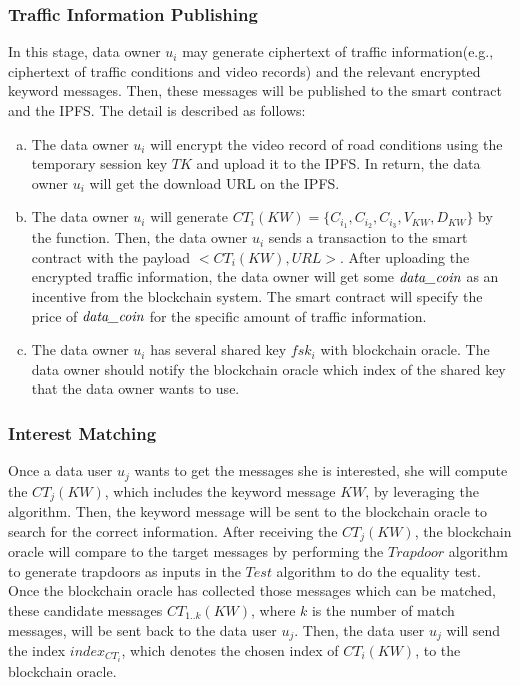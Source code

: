 \documentclass[journal]{IEEEtran}
\begin{document}
    \subsubsection{\textbf{Traffic Information Publishing}}
    
    In this stage, data owner $u_i$ may generate ciphertext of traffic information(e.g., ciphertext of traffic conditions and video records) and the relevant encrypted keyword messages. Then, these messages will be published to the smart contract and the IPFS. The detail is described as follows:

\begin{enumerate}[a.]
    
    \item 
    The data owner $u_i$ will encrypt the video record of road conditions using the temporary session key $TK$ and upload it to the IPFS. In return, the data owner $u_i$ will get the download URL on the IPFS.
    
    \item 
    The data owner $u_i$ will generate  $CT_i(KW) = \{C_{i_1}, C_{i_2}, C_{i_3}, V_{KW}, D_{KW}\}$ by the  function. Then, the data owner $u_i$ sends a transaction to the smart contract with the payload $<CT_i(KW), URL>$. After uploading the encrypted traffic information, the data owner will get some $\emph{data\_coin}$ as an incentive from the blockchain system. The smart contract will specify the price of $\emph{data\_coin}$ for the specific amount of traffic information.
    
    \item 
    The data owner $u_i$ has several shared key $fsk_i$ with blockchain oracle. The data owner should notify the blockchain oracle which index of the shared key that the data owner wants to use.
    
\end{enumerate}

    \subsubsection{\textbf{Interest Matching}}
    
    Once a data user $u_j$ wants to get the messages she is interested, she will compute the $CT_j(KW)$, which includes the keyword message $KW$, by leveraging the  algorithm. Then, the keyword message will be sent to the blockchain oracle to search for the correct information. After receiving the $CT_j(KW)$, the blockchain oracle will compare to the target messages by performing the $Trapdoor$ algorithm to generate trapdoors as inputs in the $Test$ algorithm to do the equality test. Once the blockchain oracle has collected those messages which can be matched, these candidate messages $CT_{1..k}(KW)$, where $k$ is the number of match messages, will be sent back to the data user $u_j$. Then, the data user $u_j$ will send the index $index_{CT_i}$, which denotes the chosen index of $CT_i(KW)$, to the blockchain oracle.
\end{document}
